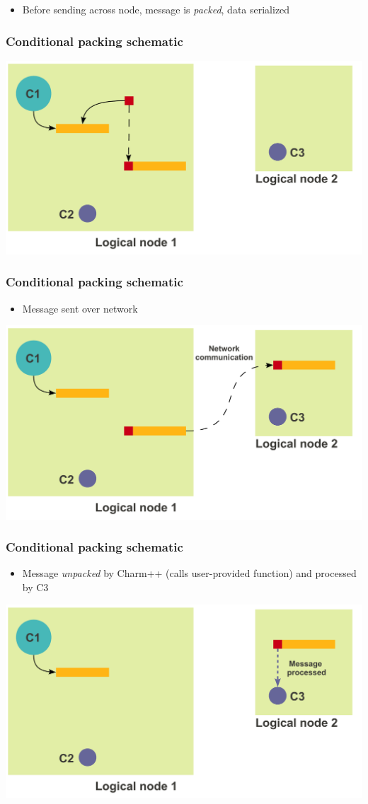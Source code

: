 \begin{frame}[fragile]
  \begin{itemize}
    \item Before sending across node, message is {\em packed}, data serialized
  \end{itemize}
  \frametitle{Conditional packing schematic}
  \includegraphics[width=\textwidth]{figures/advancedOpts/fig3}
\end{frame}

\begin{frame}[fragile]
  \frametitle{Conditional packing schematic}
  \begin{itemize}
    \item Message sent over network
  \end{itemize}
  \includegraphics[width=\textwidth]{figures/advancedOpts/fig3_1}
\end{frame}

\begin{frame}[fragile]
  \frametitle{Conditional packing schematic}
  \begin{itemize}
    \item Message {\em unpacked} by Charm++ (calls user-provided function) and processed by C3
  \end{itemize}
  \includegraphics[width=\textwidth]{figures/advancedOpts/fig3_2}
\end{frame}

